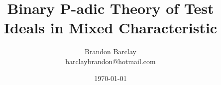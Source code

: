 \documentclass[12pt]{article}
\begin{document}
\title{Binary P-adic Theory of Test Ideals in Mixed Characteristic}
\author{Brandon Barclay\\barclaybrandon@hotmail.com}
\date{\today}
\maketitle

\begin{abstract}

\end{abstract}











\appendix




\end{document}
